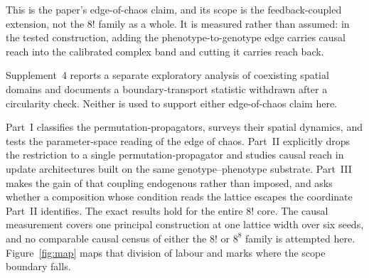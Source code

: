 \documentclass[man,12pt,floatsintext,donotrepeattitle]{apa7}
\begin{document}
This is the paper's edge-of-chaos claim, and its scope is the feedback-coupled
extension, not the $8!$ family as a whole. It is measured rather than assumed:
in the tested construction, adding the phenotype-to-genotype edge carries
causal reach into the calibrated complex band and cutting it carries reach back.

Supplement~4 reports a separate exploratory analysis of
coexisting spatial domains and documents a boundary-transport statistic
withdrawn after a circularity check. Neither is used to support either
edge-of-chaos claim here.

Part~I classifies the permutation-propagators, surveys their spatial dynamics,
and tests the parameter-space reading of the edge of chaos. Part~II explicitly
drops the restriction to a single permutation-propagator and studies causal
reach in update architectures built on the same genotype--phenotype substrate.
Part~III makes the gain of that coupling endogenous rather than imposed, and asks
whether a composition whose condition reads the lattice escapes the coordinate
Part~II identifies.
The exact results hold for the entire $8!$ core. The causal measurement covers
one principal construction at one lattice width over six seeds, and no
comparable causal census of either the $8!$ or $8^8$ family is attempted here.
Figure~\ref{fig:map} maps that division of labour and marks where the scope
boundary falls.
\end{document}
